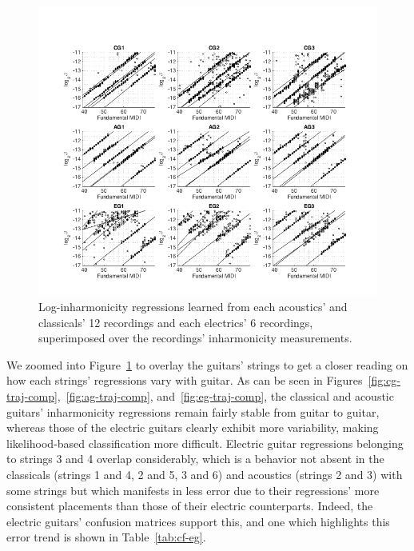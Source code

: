 \documentclass[12pt]{cmuthesis}
\begin{document}
\begin{figure}[!htbp] 
\centering
\includegraphics[scale=0.65]{regs3by3}
\caption{Log-inharmonicity regressions learned from each acoustics' and classicals' 12 recordings and each electrics' 6 recordings, superimposed over the recordings' inharmonicity measurements.}
\label{fig:regs3by3}
\end{figure}

We zoomed into Figure~\ref{fig:regs3by3} to overlay the guitars' strings to get a closer reading on how each strings' regressions vary with guitar. As can be seen in Figures~\ref{fig:cg-traj-comp},~\ref{fig:ag-traj-comp}, and~\ref{fig:eg-traj-comp}, the classical and acoustic guitars' inharmonicity regressions remain fairly stable from guitar to guitar, whereas those of the electric guitars clearly exhibit more variability, making likelihood-based classification more difficult. Electric guitar regressions belonging to strings 3 and 4 overlap considerably, which is a behavior not absent in the classicals (strings 1 and 4, 2 and 5, 3 and 6) and acoustics (strings 2 and 3) with some strings but which manifests in less error due to their regressions' more consistent placements than those of their electric counterparts. Indeed, the electric guitars' confusion matrices support this, and one which highlights this error trend is shown in Table~\ref{tab:cf-eg}. 
\end{document}
